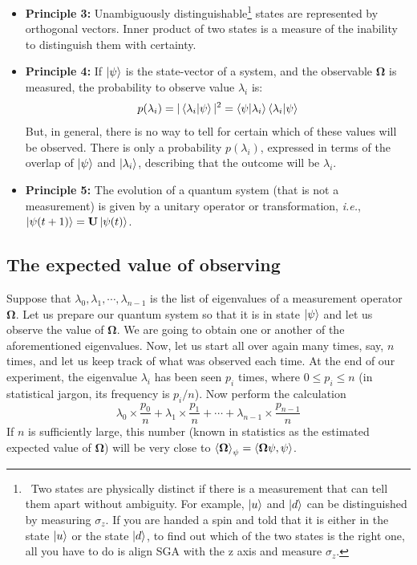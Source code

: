 \documentclass{easyclass}
\begin{document}
\begin{itemize}
	\item \textbf{Principle 3:} Unambiguously distinguishable\footnote{\ Two states are physically distinct if there is a measurement that can tell them apart without ambiguity. For example, $\ket{u}$ and $\ket{d}$ can be distinguished by measuring $\sigma_z$. If you are handed a spin and told that it is either in the state $\ket{u}$ or the state $\ket{d}$, to find out which of the two states is the right one, all you have to do is align SGA with the z axis and measure $\sigma_z$.} states are represented by orthogonal vectors. Inner product of two states is a measure of the inability to distinguish them with certainty.
	
	\item \textbf{Principle 4:} If $\ket{\psi}$ is the state-vector of a system, and the observable $\mathbf{\Omega}$ is measured, the probability to observe value $\lambda_i$ is:
	\begin{equation}
		p(\lambda_i) = |\braket{\lambda_i|\psi}|^2=\braket{\psi|\lambda_i}\braket{\lambda_i|\psi}
	\end{equation} 
	But, in general, there is no way to tell for certain which of these values will be observed. There is only a probability $p(\lambda_i)$, expressed in terms of the overlap of $\ket{\psi}$ and $\ket{\lambda_i}$, describing that the outcome will be $\lambda_i$.
	
	\item \textbf{Principle 5:} The evolution of a quantum system (that is not a measurement) is given by a unitary operator or transformation, \textit{i.e.},  $\ket{\psi(t+1)}=\mathbf{U}\ket{\psi(t)}$.
	
\end{itemize}

\subsection{The expected value of observing}
Suppose that $\lambda_0,\lambda_1,\cdots,\lambda_{n-1}$ is the list of eigenvalues of a measurement operator $\mathbf{\Omega}$. Let us prepare our quantum system so that it is in
state $\ket{\psi}$ and let us observe the value of $\mathbf{\Omega}$. We are going to obtain one or another of the aforementioned eigenvalues. Now, let us start all over again many times, say,
$n$ times, and let us keep track of what was observed each time. At the end of our
experiment, the eigenvalue $\lambda_i$ has been seen $p_i$ times, where $0 \leq p_i \leq n$ (in statistical jargon, its frequency is $p_i/n$). Now perform the calculation
\begin{equation}
	\lambda_0\times\frac{p_0}{n}+\lambda_1\times\frac{p_1}{n}+\cdots+\lambda_{n-1}\times\frac{p_{n-1}}{n}
\end{equation}
If $n$ is sufficiently large, this number (known in statistics as the estimated expected
value of $\mathbf{\Omega}$) will be very close to $\braket{\mathbf{\Omega}}_{\psi}=\braket{\mathbf{\Omega}\psi,\psi}$.
\end{document}

